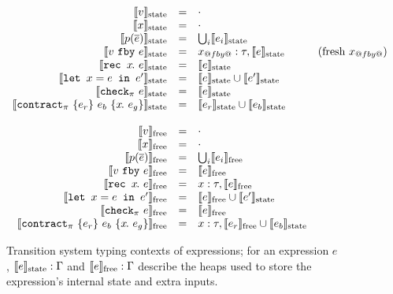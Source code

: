 
\newcommand{\sysinit}[1]{\systrans{#1}_{\text{init}}}
\newcommand{\sysvalue}[1]{\systrans{#1}_{\text{value}}}
\newcommand{\sysupdate}[1]{\systrans{#1}_{\text{update}}}
\newcommand{\sysrely}[1]{\systrans{#1}_{\text{rely}}}
\newcommand{\sysguar}[1]{\systrans{#1}_{\text{guar}}}
\newcommand{\xctr}{\xcontractP{\PStatus}{e_r}{e_b}{\rawbind{x}{e_g}}}

\newcommand{\sysstate}[1]{\systrans{#1}_{\text{state}}}
\newcommand{\sysoracle}[1]{\systrans{#1}_{\text{free}}}

\begin{figure}
  \small
  \[
  \begin{array}{rrlr}
    \sysstate{v} & = & \cdot \\
    \sysstate{x} & = & \cdot \\
    \sysstate{p(\ov{e})} & = & \bigcup_i \sysstate{e_i} \\
    \sysstate{\xfby{v}{e}} & = & x_{@fby@}: \tau, \sysstate{e} & \text{(fresh $x_{@fby@}$)} \\
    \sysstate{\xrec{x}{e}} & = & \sysstate{e} \\
    \sysstate{\xlet{x}{e}{e'}} & = & \sysstate{e} \cup \sysstate{e'} \\
    \sysstate{\xcheckP{\PStatus}{e}} & = & \sysstate{e} \\
    \sysstate{\xctr} & = & \sysstate{e_r} \cup \sysstate{e_b} \\
    \\
    \sysoracle{v} & = & \cdot \\
    \sysoracle{x} & = & \cdot \\
    \sysoracle{p(\ov{e})} & = & \bigcup_i \sysoracle{e_i} \\
    \sysoracle{\xfby{v}{e}} & = & \sysoracle{e} \\
    \sysoracle{\xrec{x}{e}} & = & x: \tau, \sysoracle{e} \\
    \sysoracle{\xlet{x}{e}{e'}} & = & \sysoracle{e} \cup \sysstate{e'} \\
    \sysoracle{\xcheckP{\PStatus}{e}} & = & \sysoracle{e} \\
    \sysoracle{\xctr} & = & x: \tau, \sysoracle{e_r} \cup \sysstate{e_b} \\
  \end{array}
\]
\caption{Transition system typing contexts of expressions; for an expression $e$, $\sysstate{e} : \Gamma$ and $\sysoracle{e} : \Gamma$ describe the heaps used to store the expression's internal state and extra inputs.}
\label{f:system-translation-contexts}
\end{figure}

